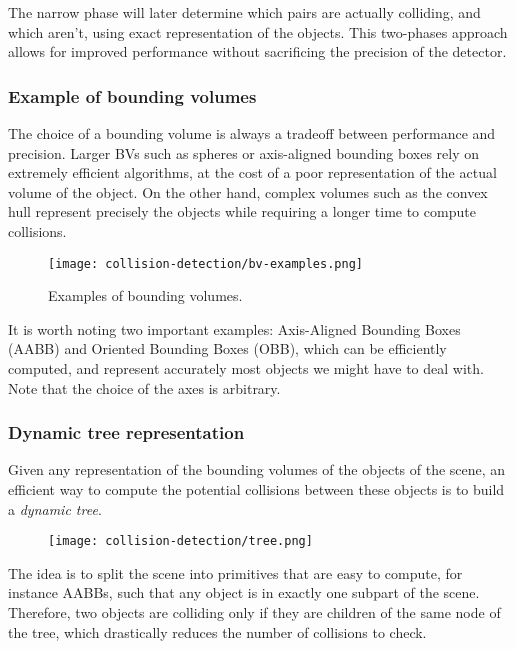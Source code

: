 The narrow phase will later determine which pairs are actually colliding, and which aren't, using exact representation of the objects. This two-phases approach allows for improved performance without sacrificing the precision of the detector.

\subsubsection{Example of bounding volumes}
The choice of a bounding volume is always a tradeoff between performance and precision. Larger BVs such as spheres or axis-aligned bounding boxes rely on extremely efficient algorithms, at the cost of a poor representation of the actual volume of the object. On the other hand, complex volumes such as the convex hull represent precisely the objects while requiring a longer time to compute collisions.
\begin{figure}[H]
    \centering
    \texttt{[image: collision-detection/bv-examples.png]}
    \caption{Examples of bounding volumes.}
\end{figure}
It is worth noting two important examples: Axis-Aligned Bounding Boxes (AABB) and Oriented Bounding Boxes (OBB), which can be efficiently computed, and represent accurately most objects we might have to deal with. Note that the choice of the axes is arbitrary.

\subsubsection{Dynamic tree representation}
Given any representation of the bounding volumes of the objects of the scene, an efficient way to compute the potential collisions between these objects is to build a \emph{dynamic tree}.
\begin{figure}[H]
    \centering
    \texttt{[image: collision-detection/tree.png]}
\end{figure}
The idea is to split the scene into primitives that are easy to compute, for instance AABBs, such that any object is in exactly one subpart of the scene. Therefore, two objects are colliding only if they are children of the same node of the tree, which drastically reduces the number of collisions to check.

